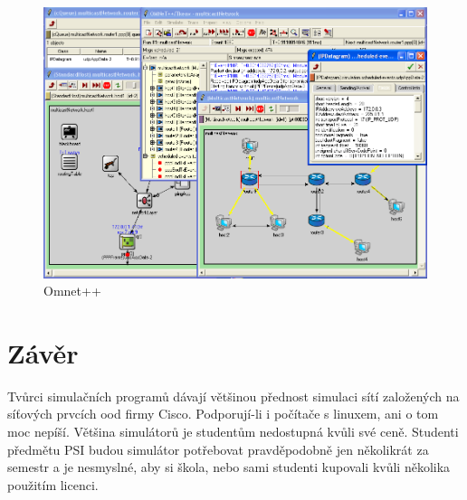 \begin{figure}[h]
\begin{center}
\includegraphics[width=12cm]{obrazky/omnet}
\caption{Omnet++}
\label{obr_omnet}
\end{center}
\end{figure}




\section{Závěr}

Tvůrci simulačních programů dávají většinou přednost simulaci sítí založených na síťových prvcích ood firmy Cisco. Podporují-li i počítače s linuxem, ani o tom moc nepíší. Většina simulátorů je studentům nedostupná kvůli své ceně. Studenti předmětu PSI budou simulátor potřebovat pravděpodobně jen několikrát za semestr a je nesmyslné, aby si škola, nebo sami studenti kupovali kvůli několika použitím licenci.

